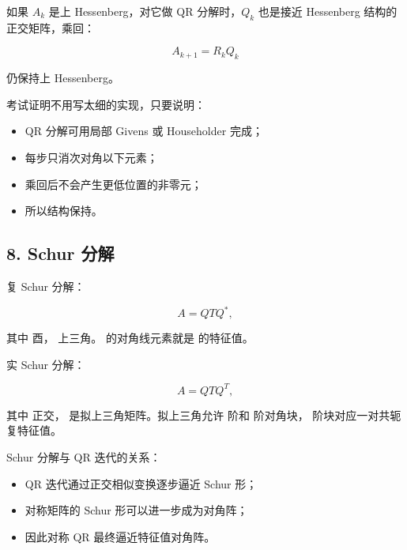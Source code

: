 \documentclass[11pt,a4paper]{ctexart}
\newcommand{\code}[1]{\begingroup\ttfamily\small #1\endgroup}
\begin{document}

如果 $A_k$ 是上 Hessenberg，对它做 QR 分解时，$Q_k$ 也是接近 Hessenberg 结构的正交矩阵，乘回：

\[
A_{k+1}=R_kQ_k
\]

仍保持上 Hessenberg。

考试证明不用写太细的实现，只要说明：

\begin{itemize}

\item QR 分解可用局部 Givens 或 Householder 完成；

\item 每步只消次对角以下元素；

\item 乘回后不会产生更低位置的非零元；

\item 所以结构保持。

\end{itemize}


\subsection*{8. Schur 分解}


复 Schur 分解：

\[
A=QTQ^*,
\]

其中 \code{} 酉，\code{} 上三角。\code{\detokenize{T}} 的对角线元素就是 \code{} 的特征值。

实 Schur 分解：

\[
A=QTQ^T,
\]

其中 \code{} 正交，\code{} 是拟上三角矩阵。拟上三角允许 \code{} 阶和 \code{} 阶对角块，\code{\detokenize{2}} 阶块对应一对共轭复特征值。

Schur 分解与 QR 迭代的关系：

\begin{itemize}

\item QR 迭代通过正交相似变换逐步逼近 Schur 形；

\item 对称矩阵的 Schur 形可以进一步成为对角阵；

\item 因此对称 QR 最终逼近特征值对角阵。

\end{itemize}
\end{document}
